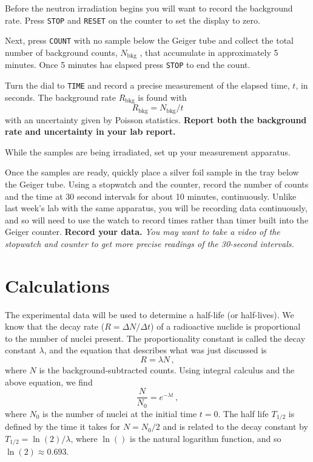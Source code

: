 \begin{steps}
	\item Before the neutron irradiation begins you will want to record the background rate. Press
\texttt{STOP} and \texttt{RESET} on the counter to set the display to zero.

	\item Next, press \texttt{COUNT} with no
sample below the Geiger tube and collect the total number of background counts, $N_\textrm{bkg}$ ,
that accumulate in approximately 5 minutes. Once 5 minutes has elapsed press \texttt{STOP} to
end the count.

	\item Turn the dial to \texttt{TIME} and record a precise measurement of the elapsed
time, $t$, in seconds. The background rate $R_\textrm{bkg}$ is found with
\begin{equation}
R_\textrm{bkg} = N_\textrm{bkg} /t
\end{equation}
with an uncertainty given by Poisson statistics. \textbf{Report both the background rate and uncertainty in your lab report.}

	\item While the samples are being irradiated, set up your measurement apparatus.

	\item Once the samples are ready, quickly place a silver foil sample in the tray below the Geiger tube. Using a stopwatch and the counter, record the number of counts and the time at 30 second intervals for about 10 minutes, continuously. Unlike last week's lab with the same apparatus, you will be recording data continuously, and so will need to use the watch to record times rather
than timer built into the Geiger counter. \textbf{Record your data.} \textit{You may want to take a video of the stopwatch and counter to get more precise readings of the 30-second intervals.}
\end{steps}


\section{Calculations}

The experimental data will be used to determine a half-life (or half-lives). We know that
the decay rate ($R=\Delta N / \Delta t$) of a radioactive nuclide is proportional to the number of nuclei present. The proportionality constant is called the decay constant $\lambda$, and the equation that describes what was just discussed is
\begin{equation}
 R = \lambda N \,,
\end{equation}
where $N$ is the background-subtracted counts. Using integral calculus and the above equation, we find
\begin{equation}
 \frac{N}{N_0} = e^{-\lambda t} \,,
\end{equation}
where $N_0$ is the number of nuclei at the initial time $t=0$. The half life $T_{1/2}$ is defined by
the time it takes for $N = N_0 /2$ and is related to the decay constant by $T_{1/2} = \ln(2)/ \lambda$, where
$\ln()$ is the natural logarithm function, and so $\ln(2) \approx 0.693$.

